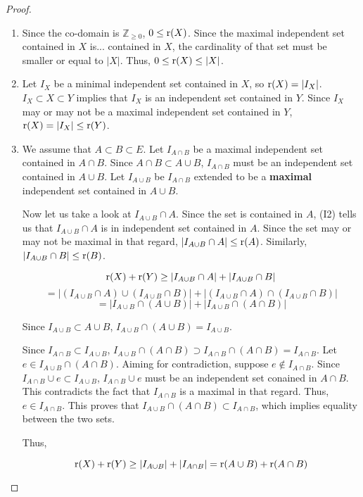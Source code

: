 \begin{proof}
    \,
    \begin{enumerate}
        \item Since the co-domain is $\mathbb{Z}_{\geq0}$, $0\leq\text{r}(X)$. Since the maximal independent set contained in $X$ is... contained in $X$, the cardinality of that set must be smaller or equal to $|X|$. Thus, $0\leq\text{r}(X)\leq|X|$.
        \item Let $I_X$ be a minimal independent set contained in $X$, so $\text{r}(X)=|I_X|$. $I_X\subset X\subset Y$ implies that $I_X$ is an independent set contained in $Y$. Since $I_X$ may or may not be a maximal independent set contained in $Y$, $\text{r}(X)=|I_X|\leq\text{r}(Y)$. 
        \item We assume that $A\subset B\subset E$. Let $I_{A\cap B}$ be a maximal independent set contained in $A\cap B$. Since $A\cap B\subset A\cup B$, $I_{A\cap B}$ must be an independent set contained in $A\cup B$. Let $I_{A\cup B}$ be $I_{A\cap B}$ extended to be a \textbf{maximal} independent set contained in $A\cup B$. 
        
        Now let us take a look at $I_{A\cup B}\cap A$. Since the set is contained in $A$, (I2) tells us that $I_{A\cup B}\cap A$ is in independent set contained in $A$. Since the set may or may not be maximal in that regard, $|I_{A\cup B}\cap A|\leq \text{r}(A)$. Similarly, $|I_{A\cup B}\cap B|\leq \text{r}(B) $.
        
        $$ \text{r}(X)+\text{r}(Y) \geq |I_{A\cup B}\cap A|+|I_{A\cup B}\cap B| $$
        $$ = |(I_{A\cup B}\cap A)\cup(I_{A\cup B}\cap B)|+|(I_{A\cup B}\cap A)\cap(I_{A\cup B}\cap B)| $$
        $$ = |I_{A\cup B}\cap (A\cup B)|+|I_{A\cup B}\cap (A\cap B)| $$

        Since $I_{A\cup B}\subset A\cup B$, $I_{A\cup B}\cap(A\cup B) = I_{A\cup B}$.

        Since $I_{A\cap B}\subset I_{A\cup B}$, $I_{A\cup B}\cap (A\cap B) \supset I_{A\cap B}\cap (A\cap B) = I_{A\cap B} $. Let $e\in I_{A\cup B}\cap (A\cap B)$. Aiming for contradiction, suppose $e\notin I_{A\cap B}$. Since $I_{A\cap B}\cup e \subset I_{A\cup B} $, $I_{A\cap B}\cup e$ must be an independent set conained in $A\cap B$. This contradicts the fact that $I_{A\cap B}$ is a maximal in that regard. Thus, $e\in I_{A\cap B}$. This proves that $I_{A\cup B}\cap(A\cap B)\subset I_{A\cap B} $, which implies equality between the two sets.

        Thus,

        $$ \text{r}(X)+\text{r}(Y) \geq |I_{A\cup B}|+|I_{A\cap B}| = \text{r}(A\cup B)+\text{r}(A\cap B) $$
    \end{enumerate}
\end{proof}
